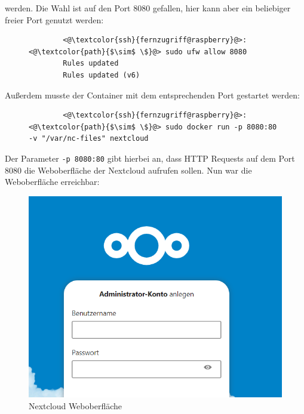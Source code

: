 \documentclass[a4paper, 11pt]{scrartcl}
\begin{document}
werden. Die Wahl ist auf den Port 8080 gefallen, hier kann aber ein beliebiger freier Port genutzt werden:
\begin{figure}[H]
    \begin{mdframed}[backgroundcolor=bbg]
        \begin{lstlisting}
        <@\textcolor{ssh}{fernzugriff@raspberry}@>:<@\textcolor{path}{$\sim$ \$}@> sudo ufw allow 8080
        Rules updated
        Rules updated (v6)
        \end{lstlisting}
    \end{mdframed}
    \label{lst:port_nextcloud}
\end{figure}
Außerdem musste der Container mit dem entsprechenden Port gestartet werden:
\begin{figure}[H]
    \begin{mdframed}[backgroundcolor=bbg]
        \begin{lstlisting}
        <@\textcolor{ssh}{fernzugriff@raspberry}@>:<@\textcolor{path}{$\sim$ \$}@> sudo docker run -p 8080:80 -v "/var/nc-files" nextcloud
        \end{lstlisting}
    \end{mdframed}
    \label{lst:port_nextcloud}
\end{figure}
Der Parameter \lstinline[basicstyle={\small\ttfamily\color{black}}]|-p 8080:80| gibt hierbei an, dass HTTP Requests auf dem Port 8080 die Weboberfläche der Nextcloud aufrufen
sollen. Nun war die Weboberfläche erreichbar:
\begin{figure}[H]
    \begin{center}
        \includegraphics[scale=0.5]{Bilder/nextcloud_web.png}
        \caption{Nextcloud Weboberfläche}
    \end{center}
\end{figure}
\end{document}
